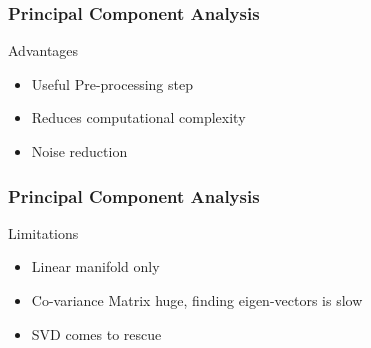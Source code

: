 %
%
%
%
%

\begin{frame}[fragile]
\frametitle{Principal Component Analysis}
Advantages
\begin{itemize}
	\item Useful Pre-processing step
	\item Reduces computational complexity
	\item Noise reduction
\end{itemize}
\end{frame}

\begin{frame}[fragile]
\frametitle{Principal Component Analysis}
Limitations
\begin{itemize}
	\item Linear manifold only
	\item 
Co-variance Matrix huge, finding eigen-vectors is slow
	\item 
SVD comes to rescue

\end{itemize}
\end{frame}



